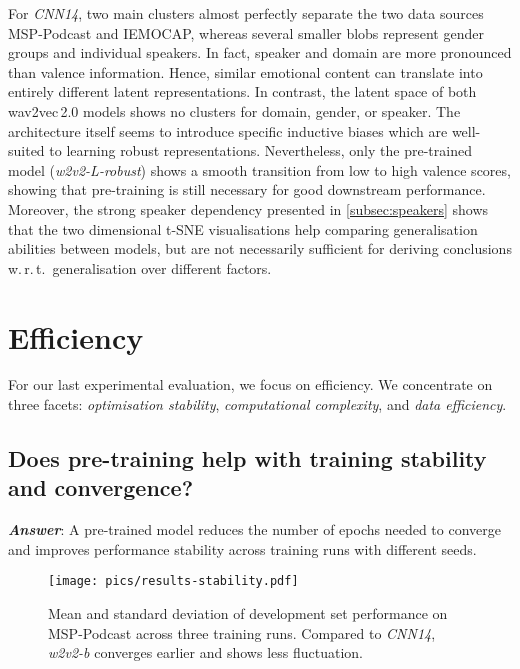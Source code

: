 \documentclass{article}
\newcommand\cnn{\mbox{\emph{CNN14}}}
\newcommand\wbase{\mbox{\emph{w2v2-b}}}
\newcommand\wrobust{\mbox{\emph{w2v2-L-robust}}}
\newcommand\msppodcast{\mbox{MSP-Podcast}}
\newcommand\iemocap{\mbox{IEMOCAP}}
\newcommand{\wtov}{wav2vec\,2.0}
\newcommand{\wrt}{w.\,r.\,t.\ }
\begin{document}
For {\cnn}, two main clusters almost perfectly separate the two data sources {\msppodcast} and {\iemocap},
whereas several smaller blobs represent gender groups and individual speakers.
In fact, speaker and domain are more pronounced than valence information. 
Hence, similar emotional content can translate into entirely different latent representations. 
In contrast,
the latent space of both {\wtov} models shows no clusters for domain, gender, or speaker.
The architecture itself seems to introduce specific inductive biases
which are well-suited to learning robust representations.
Nevertheless, only the pre-trained model ({\wrobust}) shows a smooth transition from low to high valence scores,
showing that pre-training is still necessary for good downstream performance.
Moreover, the strong speaker dependency presented in \cref{subsec:speakers}
shows that the two dimensional t-SNE visualisations help comparing generalisation abilities between models,
but are not necessarily sufficient for deriving conclusions \wrt generalisation over different factors.





\section{Efficiency}
\label{sec:efficiency}

For our last experimental evaluation,
we focus on efficiency.
We concentrate on three facets:
\emph{optimisation stability},
\emph{computational complexity},
and \emph{data efficiency}.






\subsection{Does pre-training help with training stability and convergence?}
\label{subsec:stability}

\emph{\textbf{Answer}}:
A pre-trained model reduces the number of epochs needed to converge
and improves performance stability across training runs with different seeds.

\begin{figure}[t]
    \centering
    \texttt{[image: pics/results-stability.pdf]}
    \caption{
        Mean and standard deviation of development set performance on {\msppodcast} across three training runs.
        Compared to \emph{\cnn}, \emph{\wbase} converges earlier and shows less fluctuation.
}
    \label{fig:stability}
\end{figure}
\end{document}
